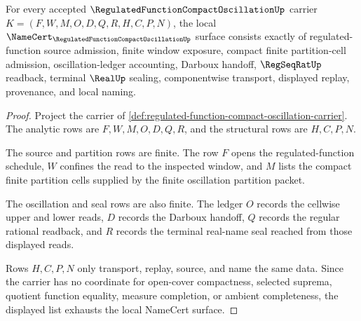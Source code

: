 \begin{theorem}
\label{thm:regulated-function-compact-oscillation-obligation-surface}
For every accepted $\RegulatedFunctionCompactOscillationUp$ carrier $K=(F,W,M,O,D,Q,R,H,C,P,N)$, the local $\NameCert_{\RegulatedFunctionCompactOscillationUp}$ surface consists exactly of regulated-function source admission, finite window exposure, compact finite partition-cell admission, oscillation-ledger accounting, Darboux handoff, $\RegSeqRatUp$ readback, terminal $\RealUp$ sealing, componentwise transport, displayed replay, provenance, and local naming.
\end{theorem}
\begin{proof}
Project the carrier of \autoref{def:regulated-function-compact-oscillation-carrier}. The analytic rows are $F,W,M,O,D,Q,R$, and the structural rows are $H,C,P,N$.

The source and partition rows are finite. The row $F$ opens the regulated-function schedule, $W$ confines the read to the inspected window, and $M$ lists the compact finite partition cells supplied by the finite oscillation partition packet.

The oscillation and seal rows are also finite. The ledger $O$ records the cellwise upper and lower reads, $D$ records the Darboux handoff, $Q$ records the regular rational readback, and $R$ records the terminal real-name seal reached from those displayed reads.

Rows $H,C,P,N$ only transport, replay, source, and name the same data. Since the carrier has no coordinate for open-cover compactness, selected suprema, quotient function equality, measure completion, or ambient completeness, the displayed list exhausts the local NameCert surface.
\end{proof}

